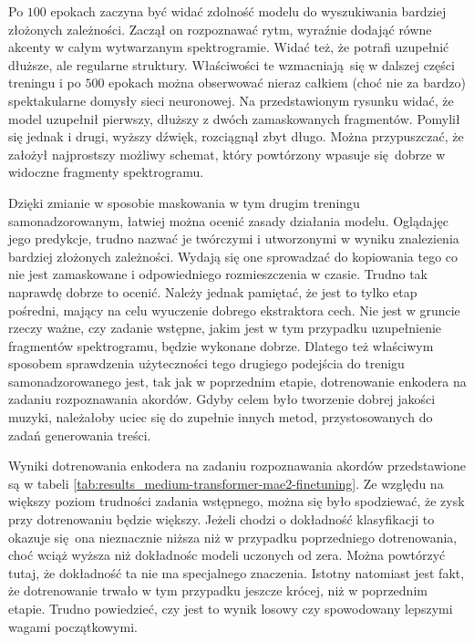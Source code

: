 Po $100$ epokach zaczyna być widać zdolność modelu do wyszukiwania bardziej złożonych zależności. Zaczął on rozpoznawać rytm, wyraźnie dodająć równe akcenty w całym wytwarzanym spektrogramie. Widać też, że potrafi uzupełnić dłuższe, ale regularne struktury. Właściwości te wzmacniają się w dalszej części treningu i po $500$ epokach można obserwować nieraz całkiem (choć nie za bardzo) spektakularne domysły sieci neuronowej. Na przedstawionym rysunku widać, że model uzupełnił pierwszy, dłuższy z dwóch zamaskowanych fragmentów. Pomylił się jednak i drugi, wyższy dźwięk, rozciągnął zbyt długo. Można przypuszczać, że założył najprostszy możliwy schemat, który powtórzony wpasuje się dobrze w widoczne fragmenty spektrogramu. 

Dzięki zmianie w sposobie maskowania w tym drugim treningu samonadzorowanym, łatwiej można ocenić zasady działania modelu. Oglądajęc jego predykcje, trudno nazwać je twórczymi i utworzonymi w wyniku znalezienia bardziej złożonych zależności. Wydają się one sprowadzać do kopiowania tego co nie jest zamaskowane i odpowiedniego rozmieszczenia w czasie. Trudno tak naprawdę dobrze to ocenić. Należy jednak pamiętać, że jest to tylko etap pośredni, mający na celu wyuczenie dobrego ekstraktora cech. Nie jest w gruncie rzeczy ważne, czy zadanie wstępne, jakim jest w tym przypadku uzupełnienie fragmentów spektrogramu, będzie wykonane dobrze. Dlatego też właściwym sposobem sprawdzenia użyteczności tego drugiego podejścia do trenigu samonadzorowanego jest, tak jak w poprzednim etapie, dotrenowanie enkodera na zadaniu rozpoznawania akordów. Gdyby celem było tworzenie dobrej jakości muzyki, należałoby uciec się do zupełnie innych metod, przystosowanych do zadań generowania treści.

Wyniki dotrenowania enkodera na zadaniu rozpoznawania akordów przedstawione są w tabeli \ref{tab:results_medium-transformer-mae2-finetuning}. Ze względu na większy poziom trudności zadania wstępnego, można się było spodziewać, że zysk przy dotrenowaniu będzie większy. Jeżeli chodzi o dokładność klasyfikacji to okazuje się ona nieznacznie niższa niż w przypadku poprzedniego dotrenowania, choć wciąż wyższa niż dokładnośc modeli uczonych od zera. Można powtórzyć tutaj, że dokładność ta nie ma specjalnego znaczenia. Istotny natomiast jest fakt, że dotrenowanie trwało w tym przypadku jeszcze krócej, niż w poprzednim etapie. Trudno powiedzieć, czy jest to wynik losowy czy spowodowany lepszymi wagami początkowymi. 

